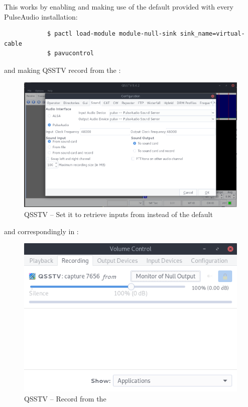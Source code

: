 		\pagebreak
		This works by enabling and making use of the default  provided with every PulseAudio installation:

		\begin{verbatim}
			$ pactl load-module module-null-sink sink_name=virtual-cable
			$ pavucontrol
		\end{verbatim}

		and making QSSTV record from the :
		
		\begin{figure}[!htbp]
			\centering
			\includegraphics[width=130mm]{figures/sstv/settings.png} \vspace{5mm}
			\caption{QSSTV -- Set it to retrieve inputs from  instead of the default }
		\end{figure}
		
		and correspondingly in :

		\begin{figure}[!htbp]
			\centering
			\includegraphics[width=130mm, frame]{figures/sstv/pavu.png} \vspace{5mm}
			\caption{QSSTV -- Record from the }
		\end{figure}

